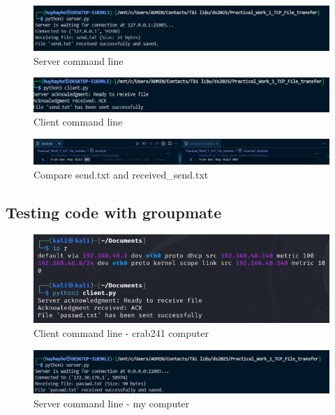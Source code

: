 \documentclass{article}
\begin{document}
\begin{figure}[h]
    \centering
    \includegraphics[width=1\linewidth]{Figure/server.png}
    \caption{Server command line}
    \label{fig:server_command_line}
\end{figure}

\begin{figure}[h]
    \centering
    \includegraphics[width=1\linewidth]{Figure/Client.png}
    \caption{Client command line}
    \label{fig:client_command_line}
\end{figure}

\begin{figure}[h]
    \centering
    \includegraphics[width=1\linewidth]{Figure/Compare.png}
    \caption{Compare send.txt and received_send.txt}
    \label{fig:compare}
\end{figure}

\subsection{Testing code with groupmate}

\begin{figure}[h]
    \centering
    \includegraphics[width=1\linewidth]{Figure/crab241_client.png}
    \caption{Client command line - crab241 computer}
    \label{fig:client_command_line}
\end{figure}


\begin{figure}[h]
    \centering
    \includegraphics[width=1\linewidth]{Figure/huy_server.png}
    \caption{Server command line - my computer}
    \label{fig:server_command_line}
\end{figure}
\end{document}
